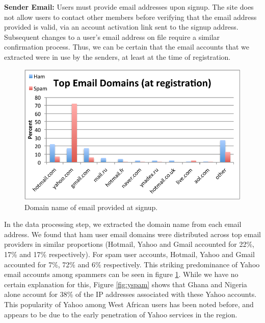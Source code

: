 \documentclass[preprint]{acm_proc_article-sp}
\begin{document}
\textbf{Sender Email:} Users must provide email addresses upon signup. The site does not allow users to contact other 
members before verifying that the email address provided is valid, via an account activation link sent to the signup 
address. Subsequent changes to a user's email address on file require a similar confirmation process. Thus, we can be certain 
that the email accounts that we extracted were in use by the senders, at least at the time of registration. 

\begin{figure}[h]
    \centering
    \includegraphics[width=\linewidth]{figures/email.pdf}
    \caption{Domain name of email provided at signup.}
    \label{fig:email}
\end{figure}

In the data processing step, we extracted the domain name from each email address. We found that ham user email domains 
were distributed across top email providers in similar proportions (Hotmail, Yahoo and Gmail accounted for 22\%, 17\% and 17\% 
respectively). For spam user accounts, Hotmail, Yahoo and Gmail accounted for 7\%, 72\% and 6\% respectively. This striking 
predominance of Yahoo email accounts among spammers can be seen in figure \ref{fig:email}. While we have no certain 
explanation for this, Figure \ref{fig:yspam} shows that Ghana and Nigeria alone account for 38\% of the IP 
addresses associated with these Yahoo accounts. This popularity of Yahoo among West African users has 
been noted before\cite{burrell}, and appears to be due to the early penetration of Yahoo services in the region.
\end{document}
